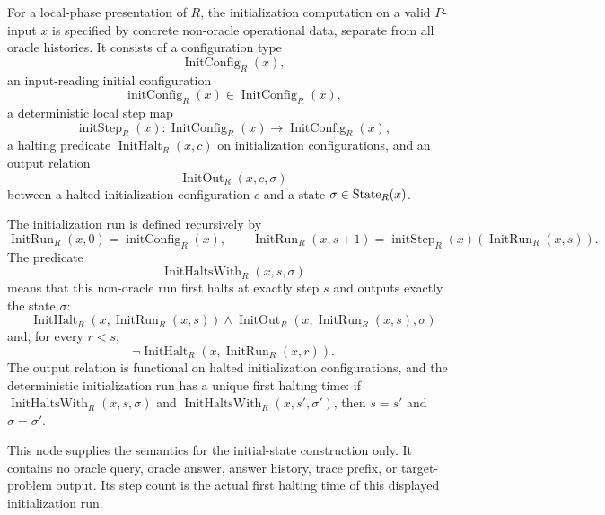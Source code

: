 \begin{definition}
  \label{def:oracle-reduction-initial-construction-semantics}
  For a local-phase presentation of $R$, the initialization computation on a
  valid $P$-input $x$ is specified by concrete non-oracle operational data,
  separate from all oracle histories.  It consists of a configuration type
  \[
    \operatorname{InitConfig}_R(x),
  \]
  an input-reading initial configuration
  \[
    \operatorname{initConfig}_R(x)\in\operatorname{InitConfig}_R(x),
  \]
  a deterministic local step map
  \[
    \operatorname{initStep}_R(x):
      \operatorname{InitConfig}_R(x)\to\operatorname{InitConfig}_R(x),
  \]
  a halting predicate $\operatorname{InitHalt}_R(x,c)$ on initialization
  configurations, and an output relation
  \[
    \operatorname{InitOut}_R(x,c,\sigma)
  \]
  between a halted initialization configuration $c$ and a state
  $\sigma\in\operatorname{State}_R(x)$.

  The initialization run is defined recursively by
  \[
    \operatorname{InitRun}_R(x,0)=\operatorname{initConfig}_R(x),
    \qquad
    \operatorname{InitRun}_R(x,s+1)=
      \operatorname{initStep}_R(x)(\operatorname{InitRun}_R(x,s)).
  \]
  The predicate
  \[
    \operatorname{InitHaltsWith}_R(x,s,\sigma)
  \]
  means that this non-oracle run first halts at exactly step $s$ and outputs
  exactly the state $\sigma$:
  \[
    \operatorname{InitHalt}_R(x,\operatorname{InitRun}_R(x,s))
    \wedge
    \operatorname{InitOut}_R(x,\operatorname{InitRun}_R(x,s),\sigma)
  \]
  and, for every $r<s$,
  \[
    \neg\operatorname{InitHalt}_R(x,\operatorname{InitRun}_R(x,r)).
  \]
  The output relation is functional on halted initialization configurations,
  and the deterministic initialization run has a unique first halting time:
  if
  $\operatorname{InitHaltsWith}_R(x,s,\sigma)$ and
  $\operatorname{InitHaltsWith}_R(x,s',\sigma')$, then
  $s=s'$ and $\sigma=\sigma'$.

  This node supplies the semantics for the initial-state construction only.
  It contains no oracle query, oracle answer, answer history, trace prefix, or
  target-problem output.  Its step count is the actual first halting time of
  this displayed initialization run.
\end{definition}

